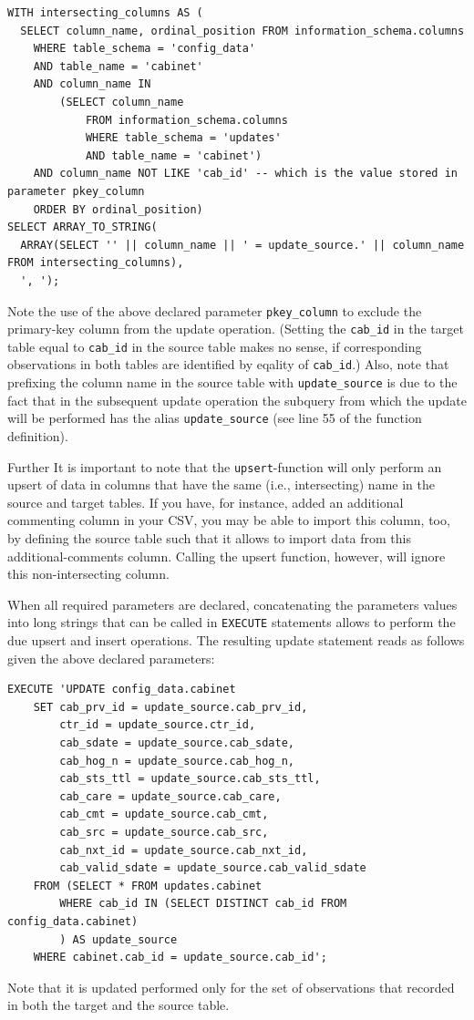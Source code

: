\begin{lstlisting}[language=postgreSQL]
WITH intersecting_columns AS (
  SELECT column_name, ordinal_position FROM information_schema.columns 
  	WHERE table_schema = 'config_data' 
  	AND table_name = 'cabinet'
  	AND column_name IN 
  		(SELECT column_name 
  			FROM information_schema.columns 
  			WHERE table_schema = 'updates'
  			AND table_name = 'cabinet')
  	AND column_name NOT LIKE 'cab_id' -- which is the value stored in parameter pkey_column
  	ORDER BY ordinal_position)
SELECT ARRAY_TO_STRING(
  ARRAY(SELECT '' || column_name || ' = update_source.' || column_name FROM intersecting_columns),
  ', ');	
\end{lstlisting}

Note the use of the above declared parameter \texttt{pkey\_column} to exclude the primary-key column from the update operation. (Setting the \texttt{cab\_id} in the target table equal to \texttt{cab\_id} in the source table makes no sense, if corresponding observations in both tables are identified by eqality of  \texttt{cab\_id}.)
Also, note that prefixing the column name in the source table with \texttt{update\_source} is due to the fact that in the subsequent update operation the subquery from which the update will be performed has the alias \texttt{update\_source} (see line 55 of the function definition). 

Further It is important to note that the \texttt{upsert}-function will only perform an upsert of data in columns that have the same (i.e., intersecting) name in the source and target tables.
If you have, for instance, added an additional commenting column in your CSV, you may be able to import this column, too, by defining the source table such that it allows to import data from this additional-comments column. 
Calling the upsert function, however, will ignore this non-intersecting column.

When all required parameters are declared, concatenating the parameters values into long strings that can be called in \texttt{EXECUTE} statements allows to perform the due upsert and insert operations.
The resulting update statement reads as follows given the above declared parameters:
\begin{lstlisting}[language=postgreSQL]
EXECUTE 'UPDATE config_data.cabinet 
	SET cab_prv_id = update_source.cab_prv_id, 
		ctr_id = update_source.ctr_id, 
		cab_sdate = update_source.cab_sdate, 
		cab_hog_n = update_source.cab_hog_n, 
		cab_sts_ttl = update_source.cab_sts_ttl, 
		cab_care = update_source.cab_care, 
		cab_cmt = update_source.cab_cmt, 
		cab_src = update_source.cab_src, 
		cab_nxt_id = update_source.cab_nxt_id, 
		cab_valid_sdate = update_source.cab_valid_sdate
	FROM (SELECT * FROM updates.cabinet 
		WHERE cab_id IN (SELECT DISTINCT cab_id FROM config_data.cabinet) 
		) AS update_source 
	WHERE cabinet.cab_id = update_source.cab_id';
\end{lstlisting}
Note that it is updated performed only for the set of observations that recorded in both the target and the source table. 

